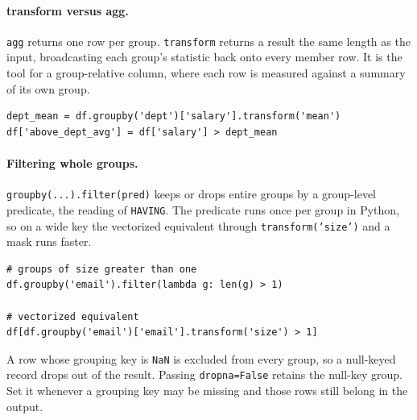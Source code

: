 \vspace{-2ex}

\paragraph{transform versus agg.} \texttt{agg} returns one row per group. \texttt{transform} returns a result the same length as the input, broadcasting each group's statistic back onto every member row. It is the tool for a group-relative column, where each row is measured against a summary of its own group.

\begin{lstlisting}[style=python, caption={A group-relative column via transform}]
dept_mean = df.groupby('dept')['salary'].transform('mean')
df['above_dept_avg'] = df['salary'] > dept_mean
\end{lstlisting}

\vspace{-1ex}

\paragraph{Filtering whole groups.} \texttt{groupby(...).filter(pred)} keeps or drops entire groups by a group-level predicate, the reading of \texttt{HAVING}. The predicate runs once per group in Python, so on a wide key the vectorized equivalent through \texttt{transform('size')} and a mask runs faster.

\begin{lstlisting}[style=python, caption={Keep groups by a group predicate (HAVING)}]
# groups of size greater than one
df.groupby('email').filter(lambda g: len(g) > 1)

# vectorized equivalent
df[df.groupby('email')['email'].transform('size') > 1]
\end{lstlisting}

\vspace{2ex}

\begin{keybox}
A row whose grouping key is \texttt{NaN} is excluded from every group, so a null-keyed record drops out of the result. Passing \texttt{dropna=False} retains the null-key group. Set it whenever a grouping key may be missing and those rows still belong in the output.
\end{keybox}

\vspace{-2ex}

